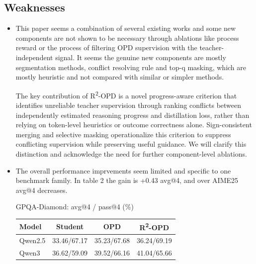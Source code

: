 \subsection*{Weaknesses}
\begin{itemize}
\item This paper seems a combination of several existing works and some new components are not shown to be necessary through ablations like process reward or the process of filtering OPD supervision with the teacher-independent signal. It seems the genuine new components are mostly segmentation methods, conflict resolving rule and top-q masking, which are mostly heuristic and not compared with similar or simpler methods.
\par{}
\begin{responsebox}[frametitle={Response to W1}]
The key contribution of R\textsuperscript{2}-OPD is a novel progress-aware criterion that identifies unreliable teacher supervision through ranking conflicts between independently estimated reasoning progress and distillation loss, rather than relying on token-level heuristics or outcome correctness alone. Sign-consistent merging and selective masking operationalize this criterion to suppress conflicting supervision while preserving useful guidance. We will clarify this distinction and acknowledge the need for further component-level ablations.
\end{responsebox}

\item The overall performance imprvements seem limited and specific to one benchmark family. In table 2 the gain is +0.43 avg@4, and over AIME25 avg@4 decreases.
\par{}
\begin{responsebox}[frametitle={Response to W2}]
GPQA-Diamond: avg@4 / pass@4 (\%)

\begin{center}
\begin{tabular}{lccc}
\hline
Model & Student & OPD & R\textsuperscript{2}-OPD \\
\hline
Qwen2.5 & 33.46/67.17 & 35.23/67.68 & 36.24/69.19 \\
Qwen3 & 36.62/59.09 & 39.52/66.16 & 41.04/65.66 \\
\hline
\end{tabular}
\end{center}
\end{responsebox}


\end{itemize}
